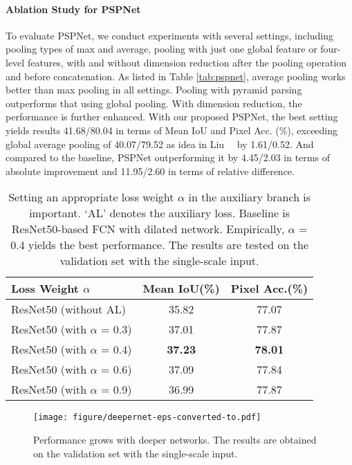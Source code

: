 \documentclass[10pt,twocolumn,letterpaper]{article}
\begin{document}
\vspace{-0.1in}
\paragraph{Ablation Study for PSPNet}
To evaluate PSPNet, we conduct experiments with several settings, including pooling types
of max and average, pooling with just one global feature or four-level features, with and
without dimension reduction after the pooling operation and before concatenation. As
listed in Table \ref{tab:pspnet}, average pooling works better than max pooling in all
settings. Pooling with pyramid parsing outperforms that using global pooling. With
dimension reduction, the performance is further enhanced. With our proposed PSPNet, the
best setting yields results 41.68/80.04 in terms of Mean IoU and Pixel Acc. (\%), exceeding
global average pooling of 40.07/79.52 as idea in Liu~\etal~\cite{liu2015parsenet} by 1.61/0.52.
And compared to the baseline, PSPNet outperforming it by 4.45/2.03 in terms of absolute
improvement and 11.95/2.60 in terms of relative difference.

\begin{table}
\footnotesize
\begin{center}
\begin{tabular}{ l c c}
\hline
Loss Weight $\alpha$ & Mean IoU(\%) & Pixel Acc.(\%) \\
\hline\hline
ResNet50 (without AL) & 35.82 & 77.07 \\
ResNet50 (with $\alpha$ = 0.3) & 37.01 & 77.87 \\
ResNet50 (with $\alpha$ = 0.4) & \textbf{37.23} & \textbf{78.01} \\
ResNet50 (with $\alpha$ = 0.6) & 37.09 & 77.84 \\
ResNet50 (with $\alpha$ = 0.9) & 36.99 & 77.87 \\
\hline
\end{tabular}
\end{center}
\caption{Setting an appropriate loss weight $\alpha$ in the auxiliary branch is
important. `AL' denotes the auxiliary loss. Baseline is ResNet50-based FCN with dilated
network. Empirically, $\alpha$ = 0.4 yields the best performance. The results are tested
on the validation set with the single-scale input.} \label{tab:auxiliaryloss}
\end{table}

\begin{figure}[t]
\begin{center}
    \texttt{[image: figure/deepernet-eps-converted-to.pdf]}
\end{center}
\caption{Performance grows with deeper networks. The results are obtained on the
validation set with the single-scale input.} \label{fig:deepernet}
\end{figure}
\end{document}
